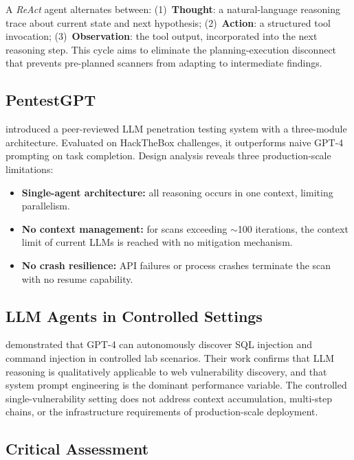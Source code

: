 \documentclass[12pt, a4paper, oneside, openany]{book}
\begin{document}
\begin{infobox}
A \textit{ReAct} agent alternates between:
(1)~\textbf{Thought}: a natural-language reasoning trace about current
state and next hypothesis;
(2)~\textbf{Action}: a structured tool invocation;
(3)~\textbf{Observation}: the tool output, incorporated into the next
reasoning step.
This cycle aims to eliminate the planning-execution disconnect that
prevents pre-planned scanners from adapting to intermediate findings.
\end{infobox}

\subsection{PentestGPT}

\citet{deng2024pentestgpt} introduced a peer-reviewed LLM penetration
testing system with a three-module architecture.  Evaluated on HackTheBox
challenges, it outperforms naive GPT-4 prompting on task completion.
Design analysis reveals three production-scale limitations:

\begin{itemize}[leftmargin=*]
  \item \textbf{Single-agent architecture:} all reasoning occurs in
    one context, limiting parallelism.
  \item \textbf{No context management:} for scans exceeding $\sim$100
    iterations, the context limit of current LLMs is reached with no
    mitigation mechanism.
  \item \textbf{No crash resilience:} API failures or process crashes
    terminate the scan with no resume capability.
\end{itemize}


\subsection{LLM Agents in Controlled Settings}

\citet{happe2023getting} demonstrated that GPT-4 can autonomously
discover SQL injection and command injection in controlled lab
scenarios. Their work confirms that LLM reasoning is qualitatively
applicable to web vulnerability discovery, and that system prompt
engineering is the dominant performance variable. The controlled
single-vulnerability setting does not address context accumulation,
multi-step chains, or the infrastructure requirements of
production-scale deployment.

\subsection{Critical Assessment}
\end{document}
